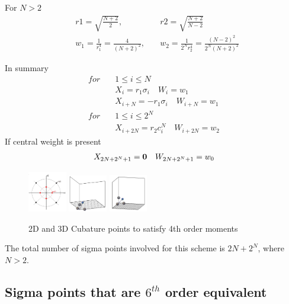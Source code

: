 \documentclass[letterpaper, 10 pt, conference]{ieeeconf}  %
\begin{document}
For $N>2$
\setlength{\arraycolsep}{0.0em}
\begin{eqnarray}
&r1=\sqrt{\frac{N+2}{2}},\quad &r2=\sqrt{\frac{N+2}{N-2}}\\
&w_1=\frac{1}{r_1^4}=\frac{4}{(N+2)^2} ,\quad &w_2=\frac{1}{2^Nr_2^4}=\frac{(N-2)^2}{2^N(N+2)^2}
\end{eqnarray}
\setlength{\arraycolsep}{5pt} 

In summary
\setlength{\arraycolsep}{0.0em}
\begin{eqnarray}
for\quad &1\le i\le N\\
&X_i=r_1\sigma_i \quad W_i=w_1\\
&X_{i+N}=-r_1\sigma_i \quad W_{i+N}=w_1\\
for \quad &1 \le i \le 2^N\\
&X_{i+2N}=r_2c^N_i \quad W_{i+2N}=w_2
\end{eqnarray}
\setlength{\arraycolsep}{5pt}
If central weight is present
\setlength{\arraycolsep}{0.0em}
\begin{eqnarray}
X_{2N+2^N+1}={\bf 0} \quad W_{2N+2^N+1}=w_0
\end{eqnarray}
\setlength{\arraycolsep}{5pt}

   \begin{figure}[thpb]
      \centering
      \includegraphics[width=0.15\textwidth]{4thmoment2d1}
      \includegraphics[width=0.15\textwidth]{4thmoment3d1}
      \includegraphics[width=0.15\textwidth]{4thmoment3d3}
      \caption{2D and 3D Cubature points to satisfy 4th order moments}
      \label{fig:23d4m1}
   \end{figure}
The total number of sigma points involved for this scheme is $2N+2^N$, where $N>2$. 


\subsection{Sigma points that are $6^{th}$ order equivalent}
\end{document}
